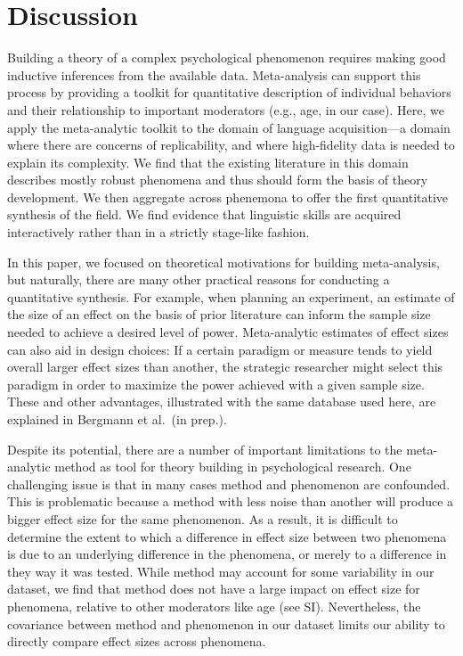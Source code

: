 \documentclass[english,floatsintext,man]{apa6}
\begin{document}
\section{Discussion}\label{discussion}

Building a theory of a complex psychological phenomenon requires making
good inductive inferences from the available data. Meta-analysis can
support this process by providing a toolkit for quantitative description
of individual behaviors and their relationship to important moderators
(e.g., age, in our case). Here, we apply the meta-analytic toolkit to
the domain of language acquisition---a domain where there are concerns
of replicability, and where high-fidelity data is needed to explain its
complexity. We find that the existing literature in this domain
describes mostly robust phenomena and thus should form the basis of
theory development. We then aggregate across phenemona to offer the
first quantitative synthesis of the field. We find evidence that
linguistic skills are acquired interactively rather than in a strictly
stage-like fashion.

In this paper, we focused on theoretical motivations for building
meta-analysis, but naturally, there are many other practical reasons for
conducting a quantitative synthesis. For example, when planning an
experiment, an estimate of the size of an effect on the basis of prior
literature can inform the sample size needed to achieve a desired level
of power. Meta-analytic estimates of effect sizes can also aid in design
choices: If a certain paradigm or measure tends to yield overall larger
effect sizes than another, the strategic researcher might select this
paradigm in order to maximize the power achieved with a given sample
size. These and other advantages, illustrated with the same database
used here, are explained in Bergmann et al.~(in prep.).

Despite its potential, there are a number of important limitations to
the meta-analytic method as tool for theory building in psychological
research. One challenging issue is that in many cases method and
phenomenon are confounded. This is problematic because a method with
less noise than another will produce a bigger effect size for the same
phenomenon. As a result, it is difficult to determine the extent to
which a difference in effect size between two phenomena is due to an
underlying difference in the phenomena, or merely to a difference in
they way it was tested. While method may account for some variability in
our dataset, we find that method does not have a large impact on effect
size for phenomena, relative to other moderators like age (see SI).
Nevertheless, the covariance between method and phenomenon in our
dataset limits our ability to directly compare effect sizes across
phenomena.
\end{document}
